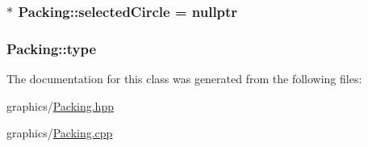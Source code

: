 \subsubsection[{selected\+Circle}]{$\ast$ Packing\+::selected\+Circle = nullptr\hspace{0.3cm}{\ttfamily [protected]}}\label{class_packing_a95c44cf9bb1c33f5b4292b970dfe58d8}
\hypertarget{class_packing_a934cbe1ef81173f5e7fbabf9846d16e2}{}
\subsubsection[{type}]{ Packing\+::type\hspace{0.3cm}{\ttfamily [protected]}}\label{class_packing_a934cbe1ef81173f5e7fbabf9846d16e2}


The documentation for this class was generated from the following files\+:\begin{DoxyCompactItemize}
\item 
graphics/\hyperlink{graphics_2_packing_8hpp}{Packing.\+hpp}\item 
graphics/\hyperlink{graphics_2_packing_8cpp}{Packing.\+cpp}\end{DoxyCompactItemize}
